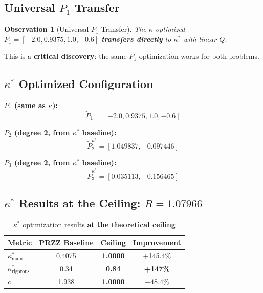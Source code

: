 \documentclass[11pt]{article}
\newtheorem{observation}[theorem]{Observation}
\begin{document}
\subsection{Universal $P_1$ Transfer}

\begin{observation}[Universal $P_1$ Transfer]
The $\kappa$-optimized $P_1 = [-2.0, 0.9375, 1.0, -0.6]$ \textbf{transfers directly} to $\kappa^*$ with linear $Q$.
\end{observation}

This is a \textbf{critical discovery}: the same $P_1$ optimization works for both problems.

\subsection{$\kappa^*$ Optimized Configuration}

\textbf{$P_1$ (same as $\kappa$):}
\begin{equation}
\tilde{P}_1 = [-2.0, 0.9375, 1.0, -0.6]
\end{equation}

\textbf{$P_2$ (degree 2, from $\kappa^*$ baseline):}
\begin{equation}
\tilde{P}_2^{\kappa^*} = [1.049837, -0.097446]
\end{equation}

\textbf{$P_3$ (degree 2, from $\kappa^*$ baseline):}
\begin{equation}
\tilde{P}_3^{\kappa^*} = [0.035113, -0.156465]
\end{equation}

\subsection{$\kappa^*$ Results at the Ceiling: $R = 1.07966$}

\begin{table}[h]
\centering
\caption{$\kappa^*$ optimization results \textbf{at the theoretical ceiling}}
\begin{tabular}{lccc}
\toprule
Metric & PRZZ Baseline & \textbf{Ceiling} & Improvement \\
\midrule
$\kappa^*_{\text{main}}$ & 0.4075 & \textbf{1.0000} & +145.4\% \\
$\kappa^*_{\text{rigorous}}$ & 0.34 & \textbf{0.84} & \textbf{+147\%} \\
$c$ & 1.938 & \textbf{1.0000} & $-48.4\%$ \\
\bottomrule
\end{tabular}
\end{table}
\end{document}
